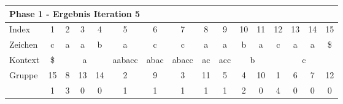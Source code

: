\begin{table}[H]
\centering
\begin{adjustbox}{max width=\textwidth}
\begin{tabular}{lccccccccccccccc}
\multicolumn{16}{l}{Phase 1 - Ergebnis Iteration 5}                                                                                                                                                                                                                                                                                                                                                                        \\ \hline
\multicolumn{1}{l|}{Index}   & 1                       & 2                         & 3                         & 4                       & 5                                                   & 6                         & \cellcolor[HTML]{\green}7  & 8                         & 9                        & 10 & 11                      & 12 & 13                        & 14                        & 15  \\
\multicolumn{1}{l|}{Zeichen} & c                       & a                         & a                         & b                       & a                                                   & c                         & c                          & a                         & a                        & b  & a                       & c  & a                         & a                         & \$  \\ \cline{1-16}
\multicolumn{1}{l|}{Kontext} & \multicolumn{1}{c|}{\$} & \multicolumn{3}{c|}{a}                                                          & \multicolumn{1}{c|}{\cellcolor[HTML]{\red}aabacc} & \multicolumn{1}{c|}{abac} & \multicolumn{1}{c|}{abacc} & \multicolumn{1}{c|}{ac}   & \multicolumn{1}{c|}{acc} & \multicolumn{2}{c|}{b}       & \multicolumn{4}{c}{c}                                            \\
\multicolumn{1}{l|}{Gruppe}      & \multicolumn{1}{c|}{15} & 8                         & 13                        & \multicolumn{1}{c|}{14} & \multicolumn{1}{c|}{\cellcolor[HTML]{\red}2}      & \multicolumn{1}{c|}{9}    & \multicolumn{1}{c|}{3}     & \multicolumn{1}{c|}{11}   & \multicolumn{1}{c|}{5}   & 4  & \multicolumn{1}{c|}{10} & 1  & 6                         & 7                         & 12  \\
\multicolumn{1}{l|}{\gsize}   & \multicolumn{1}{c|}{1}  & \cellcolor[HTML]{\red}3 & 0                         & \multicolumn{1}{c|}{0}  & \multicolumn{1}{c|}{\cellcolor[HTML]{\red}1}      & \multicolumn{1}{c|}{1}    & \multicolumn{1}{c|}{1}     & \multicolumn{1}{c|}{1}    & \multicolumn{1}{c|}{1}   & 2  & \multicolumn{1}{c|}{0}  & 4  & 0                         & 0                         & 0   \\

\end{tabular}
\end{adjustbox}
\end{table}
